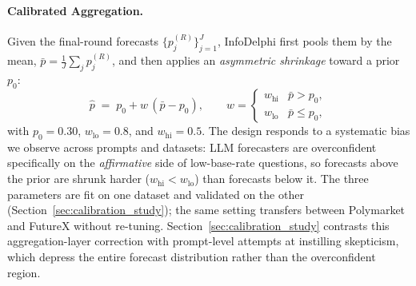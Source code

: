 \paragraph{Calibrated Aggregation.}
\label{sec:aggregation}
Given the final-round forecasts $\{p_j^{(R)}\}_{j=1}^{J}$, InfoDelphi first pools them by the mean, $\bar{p} = \frac{1}{J}\sum_j p_j^{(R)}$, and then applies an \emph{asymmetric shrinkage} toward a prior $p_0$:
\begin{equation}
  \hat{p} \;=\; p_0 + w\,(\bar{p} - p_0), \qquad
  w = \begin{cases} w_{\mathrm{hi}} & \bar{p} > p_0, \\ w_{\mathrm{lo}} & \bar{p} \le p_0, \end{cases}
  \label{eq:shrink}
\end{equation}
with $p_0 = 0.30$, $w_{\mathrm{lo}} = 0.8$, and $w_{\mathrm{hi}} = 0.5$.
The design responds to a systematic bias we observe across prompts and datasets: LLM forecasters are overconfident specifically on the \emph{affirmative} side of low-base-rate questions, so forecasts above the prior are shrunk harder ($w_{\mathrm{hi}} < w_{\mathrm{lo}}$) than forecasts below it.
The three parameters are fit on one dataset and validated on the other (Section~\ref{sec:calibration_study}); the same setting transfers between Polymarket and FutureX without re-tuning.
Section~\ref{sec:calibration_study} contrasts this aggregation-layer correction with prompt-level attempts at instilling skepticism, which depress the entire forecast distribution rather than the overconfident region.
